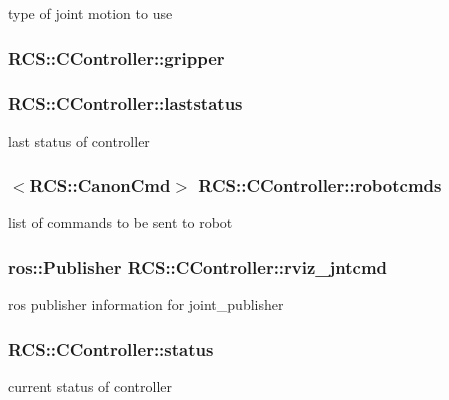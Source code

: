 type of joint motion to use \hypertarget{structRCS_1_1CController_a99ad3b40383ec1a48e55a56f1a91771f}{
\subsubsection[{gripper}]{ R\-C\-S\-::\-C\-Controller\-::gripper}}\label{structRCS_1_1CController_a99ad3b40383ec1a48e55a56f1a91771f}
\hypertarget{structRCS_1_1CController_af76ac9412dbefbaebc970d62f88a40fa}{
\subsubsection[{laststatus}]{ R\-C\-S\-::\-C\-Controller\-::laststatus}}\label{structRCS_1_1CController_af76ac9412dbefbaebc970d62f88a40fa}
last status of controller \hypertarget{structRCS_1_1CController_a6704a1f1b72409d251222738086b21c1}{
\subsubsection[{robotcmds}]{$<${\bf R\-C\-S\-::\-Canon\-Cmd}$>$ R\-C\-S\-::\-C\-Controller\-::robotcmds}}\label{structRCS_1_1CController_a6704a1f1b72409d251222738086b21c1}
list of commands to be sent to robot \hypertarget{structRCS_1_1CController_a53d259a8d8c319b8f118f37eb010ff5e}{
\subsubsection[{rviz\-\_\-jntcmd}]{\setlength{\rightskip}{0pt plus 5cm}ros\-::\-Publisher R\-C\-S\-::\-C\-Controller\-::rviz\-\_\-jntcmd}}\label{structRCS_1_1CController_a53d259a8d8c319b8f118f37eb010ff5e}
ros publisher information for joint\-\_\-publisher \hypertarget{structRCS_1_1CController_a82e9cc233cd25554964efe8a9008e0b2}{
\subsubsection[{status}]{ R\-C\-S\-::\-C\-Controller\-::status}}\label{structRCS_1_1CController_a82e9cc233cd25554964efe8a9008e0b2}
current status of controller 

